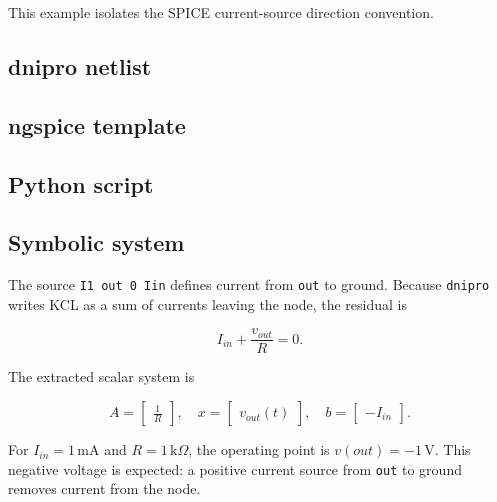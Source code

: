 \documentclass[11pt,a4paper]{article}
\newcommand{\project}{\texttt{dnipro}}
\newcommand{\code}[1]{\texttt{#1}}
\begin{document}
This example isolates the SPICE current-source direction convention.

\subsection{dnipro netlist}



\subsection{ngspice template}



\subsection{Python script}



\subsection{Symbolic system}

The source \code{I1 out 0 Iin} defines current from \code{out} to ground.
Because \project{} writes KCL as a sum of currents leaving the node, the residual
is

\begin{equation}
    I_{in} + \frac{v_{out}}{R} = 0.
\end{equation}

The extracted scalar system is

\begin{equation}
    A = \begin{bmatrix}\frac{1}{R}\end{bmatrix},
    \quad
    x = \begin{bmatrix}v_{out}(t)\end{bmatrix},
    \quad
    b = \begin{bmatrix}-I_{in}\end{bmatrix}.
\end{equation}

For \(I_{in}=1\,\mathrm{mA}\) and \(R=1\,\mathrm{k}\Omega\), the operating point
is \(v(out)=-1\,\mathrm{V}\). This negative voltage is expected: a positive
current source from \code{out} to ground removes current from the node.
\end{document}

